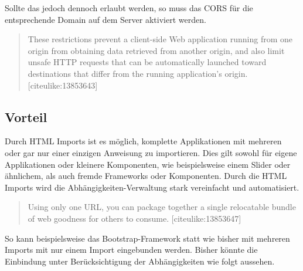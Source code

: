 Sollte das jedoch dennoch erlaubt werden, so muss das CORS für die
entsprechende Domain auf dem Server aktiviert werden.

\begin{quote}
These restrictions prevent a client-side Web application running from
one origin from obtaining data retrieved from another origin, and also
limit unsafe HTTP requests that can be automatically launched toward
destinations that differ from the running application's origin.
{[}citeulike:13853643{]}
\end{quote}

\subsection{Vorteil}\label{vorteil}

Durch HTML Imports ist es möglich, komplette Applikationen mit mehreren
oder gar nur einer einzigen Anweisung zu importieren. Dies gilt sowohl
für eigene Applikationen oder kleinere Komponenten, wie beispielsweise
einem Slider oder ähnlichem, als auch fremde Frameworks oder
Komponenten. Durch die HTML Imports wird die Abhängigkeiten-Verwaltung
stark vereinfacht und automatisiert.

\begin{quote}
Using only one URL, you can package together a single relocatable bundle
of web goodness for others to consume. {[}citeulike:13853647{]}
\end{quote}

So kann beispielsweise das Bootstrap-Framework statt wie bisher mit
mehreren Imports mit nur einem Import eingebunden werden. Bisher könnte
die Einbindung unter Berücksichtigung der Abhängigkeiten wie folgt
aussehen.

\begin{Shaded}
\begin{Highlighting}[]
\KeywordTok{>}
\KeywordTok{>}
\end{Highlighting}
\end{Shaded}

